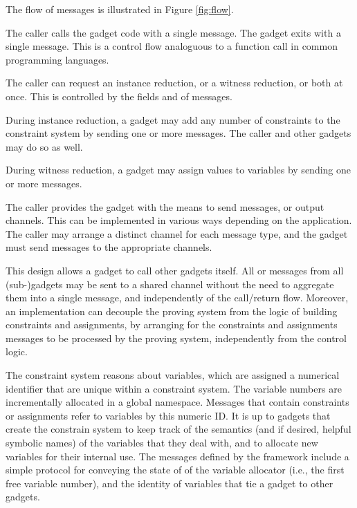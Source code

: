 	The flow of messages is illustrated in Figure \ref{fig:flow}.

	The caller calls the gadget code with a single  message.
	The gadget exits with a single  message.
	This is a control flow analoguous to a function call in common programming languages.

	The caller can request an instance reduction, or a witness reduction, or both at once.
	This is controlled by the fields  and  of  messages.

	During instance reduction,
	a gadget may add any number of constraints to the constraint system
	by sending one or more  messages.
	The caller and other gadgets may do so as well.

	During witness reduction,
	a gadget may assign values to variables
	by sending one or more  messages.

	The caller provides the gadget with the means to send messages,
	or output channels.	This can be implemented in various ways depending
	on the application.
	The caller may arrange a distinct channel for each message type,
	and the gadget must send messages to the appropriate channels.

	This design allows a gadget to call other gadgets itself.
	All  or  messages
	from all (sub-)gadgets may be sent to a shared channel
	without the need to aggregate them into a single message,
	and independently of the call/return flow.
	Moreover, an implementation can decouple the proving system
	from the logic of building constraints and assignments,
	by arranging for the constraints and assignments messages
	to be processed by the proving system, independently from the control logic.

	The constraint system reasons about variables, which are assigned a numerical identifier that are unique within a constraint system. The variable numbers are incrementally allocated in a global namespace. Messages that contain constraints or assignments refer to variables by this numeric ID. It is up to gadgets that create the constrain system to keep track of the semantics (and if desired, helpful symbolic names) of the variables that they deal with, and to allocate new variables for their internal use. The messages defined by the framework include a simple protocol for conveying the state of of the variable allocator (i.e., the first free variable number), and the identity of variables that tie a gadget to other gadgets.

